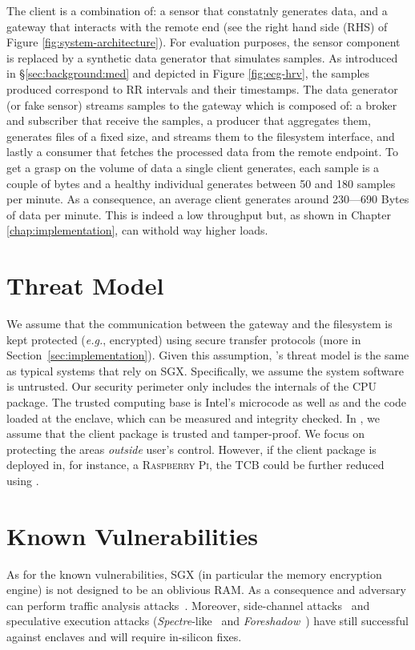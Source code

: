 The client is a combination of: a sensor that constatnly generates data, and a gateway that interacts with the remote end (see the right hand side (RHS) of Figure \ref{fig:system-architecture}). 
For evaluation purposes, the sensor component is replaced by a synthetic data generator that simulates samples.
As introduced in \S\ref{sec:background:med} and depicted in Figure \ref{fig:ecg-hrv}, the samples produced correspond to RR intervals and their timestamps.
The data generator (or fake sensor) streams samples to the gateway which is composed of: a broker and subscriber that receive the samples, a producer that aggregates them, generates files of a fixed size, and streams them to the filesystem interface, and lastly a consumer that fetches the processed data from the remote endpoint. 
To get a grasp on the volume of data a single client generates, each sample is a couple of bytes and a healthy individual generates between 50 and 180 samples per minute.
As a consequence, an average client generates around 230---690 Bytes of data per minute.
This is indeed a low throughput but, as shown in Chapter \ref{chap:implementation}, \projName can withold way higher loads.

\section{Threat Model} \label{sec:threat}

We assume that the communication between the gateway and the filesystem is kept protected (\emph{e.g.}, encrypted) using secure transfer protocols (more in Section~\ref{sec:implementation}).
Given this assumption, \projName's threat model is the same as typical systems that rely on \textsc{SGX}. 
Specifically, we assume the system software is  untrusted.
Our security perimeter only includes the internals of the CPU package. 
The trusted computing base is Intel's microcode as well as and the code loaded at the enclave, which can be measured and integrity checked. 
In \projName, we assume that the client package is trusted and tamper-proof.
We focus on protecting the areas \emph{outside} user's control. 
However, if the client package is deployed in, for instance, a \textsc{Raspberry Pi}, the TCB could be further reduced using .

\section{Known Vulnerabilities} \label{sec:vulnerabilities}

As for the known vulnerabilities, \textsc{SGX} (in particular the memory encryption engine) is not designed to be an oblivious RAM.
As a consequence and adversary can perform traffic analysis attacks~\cite{Gueron2016}.
Moreover, side-channel attacks~\cite{sgx-sidechannel} and speculative execution attacks (\textit{Spectre}-like~\cite{sgx-spectre} and \textit{Foreshadow}~\cite{foreshadow}) have still successful against enclaves and will require in-silicon fixes.
